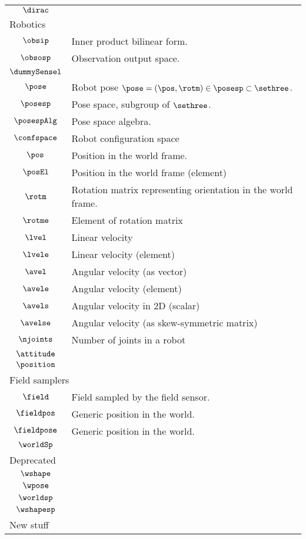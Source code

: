 \begin{longtable}{cl}
 $\dirac$ & \\ 
 \multicolumn{2}{l}{Robotics}\\ 
 \hline
$\obsip$ &  Inner product bilinear form.\\ 
 $\obsosp$ &  Observation output space.\\ 
 $\dummySensel$ & \\ 
 $\pose$ &  Robot pose $\pose = (\pos, \rotm) \in \posesp \subset \sethree$.\\ 
 $\posesp$ &  Pose space, subgroup of $\sethree$.\\ 
 $\posespAlg$ &  Pose space algebra.\\ 
 $\confspace$ &  Robot configuration space\\ 
 $\pos$ &  Position in the world frame.\\ 
 $\posEl$ &  Position in the world frame (element)\\ 
 $\rotm$ &  Rotation matrix representing orientation in the world frame.\\ 
 $\rotme$ &  Element of rotation matrix\\ 
 $\lvel$ &  Linear velocity\\ 
 $\lvele$ &  Linear velocity (element)\\ 
 $\avel$ &  Angular velocity (as vector)\\ 
 $\avele$ &  Angular velocity (element)\\ 
 $\avels$ &  Angular velocity in 2D (scalar)\\ 
 $\avelse$ &  Angular velocity (as skew-symmetric matrix)\\ 
 $\njoints$ &  Number of joints in a robot\\ 
 $\attitude$ & \\ 
 $\position$ & \\ 
 \multicolumn{2}{l}{Field samplers}\\ 
 \hline
$\field$ &  Field sampled by the field sensor.\\ 
 $\fieldpos$ &  Generic position in the world.\\ 
 $\fieldpose$ &  Generic position in the world.\\ 
 $\worldSp$ & \\ 
 \multicolumn{2}{l}{Deprecated}\\ 
 \hline
$\wshape$ & \\ 
 $\wpose$ & \\ 
 $\worldsp$ & \\ 
 $\wshapesp$ & \\ 
 \multicolumn{2}{l}{New stuff}\\ 

\end{longtable}
